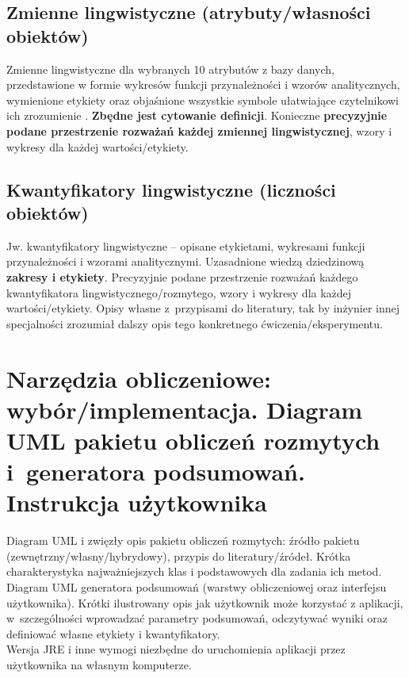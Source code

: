 \documentclass{classrep}
\begin{document}
\subsection{Zmienne lingwistyczne (atrybuty/własności obiektów)}
Zmienne lingwistyczne dla wybranych 10 atrybutów z bazy danych, przedstawione w
formie wykresów funkcji przynależności i wzorów analitycznych, wymienione etykiety oraz objaśnione wszystkie
symbole ułatwiające czytelnikowi ich zrozumienie \cite{zadrozny06}. {\bf Zbędne jest
cytowanie definicji}. Konieczne {\bf precyzyjnie podane przestrzenie rozważań każdej
zmiennej lingwistycznej}, wzory i wykresy dla każdej wartości/etykiety.

\subsection{Kwantyfikatory lingwistyczne (liczności obiektów)}
Jw. kwantyfikatory lingwistyczne -- opisane etykietami, wykresami funkcji
przynależności i wzorami analitycznymi. Uzasadnione wiedzą dziedzinową  
{\bf zakresy i etykiety}. Precyzyjnie podane przestrzenie rozważań każdego kwantyfikatora 
lingwistycznego/rozmytego, wzory i wykresy dla każdej wartości/etykiety. Opisy własne z~przypisami do literatury, tak by inżynier innej specjalności zrozumiał dalszy
opis tego konkretnego ćwiczenia/eksperymentu.  

\section{Narzędzia obliczeniowe: wybór/implementacja. Diagram UML pakietu
obliczeń rozmytych i~generatora podsumowań. Instrukcja użytkownika}

Diagram UML i zwięzły opis pakietu obliczeń rozmytych: źródło pakietu
(zewnętrzny/własny/hybrydowy), przypis do literatury/źródeł. Krótka charakterystyka
najważniejszych klas i podstawowych dla zadania ich metod. \\

Diagram UML generatora podsumowań (warstwy obliczeniowej oraz interfejsu
użytkownika). Krótki ilustrowany opis jak użytkownik może korzystać z aplikacji, w~szczególności
wprowadzać parametry  podsumowań, odczytywać wyniki oraz definiować własne etykiety i
kwantyfikatory.\\

Wersja JRE i inne wymogi niezbędne do uruchomienia aplikacji przez użytkownika na własnym komputerze. 
\end{document}
